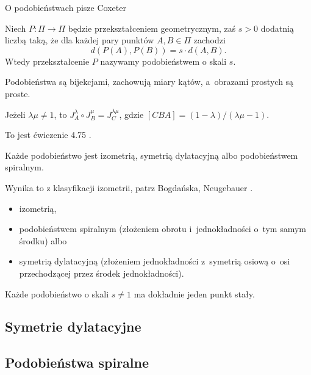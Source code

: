 
O podobieństwach pisze Coxeter \cite[s. 84]{coxeter_1967}

\begin{definition}[podobieństwo]
    Niech $P \colon \Pi \to \Pi$ będzie przekształceniem geometrycznym, zaś $s > 0$ dodatnią liczbą taką, że dla każdej pary punktów $A, B \in \Pi$ zachodzi
    \begin{equation}
        d(P(A), P(B)) = s \cdot d(A, B).
    \end{equation}
    Wtedy przekształcenie $P$ nazywamy podobieństwem o skali $s$.
\end{definition}

Podobieństwa są bijekcjami, zachowują miary kątów, a~obrazami prostych są proste.

\begin{proposition}
    Jeżeli $\lambda \mu \neq 1$, to $J_A^\lambda \circ J_B^\mu = J_C^{\lambda \mu}$, gdzie $[CBA] = (1-\lambda) / (\lambda \mu - 1)$.
\end{proposition}

To jest ćwiczenie 4.75 \cite[s. 217]{neugebauer_2018}.

\begin{proposition}
    Każde podobieństwo jest izometrią, symetrią dylatacyjną albo podobieństwem spiralnym.
\end{proposition}

Wynika to z klasyfikacji izometrii, patrz Bogdańska, Neugebauer \cite[s. 220]{neugebauer_2018}.

\begin{itemize}
        \item izometrią,
        \item podobieństwem spiralnym (złożeniem obrotu i~jednokładności o~tym samym środku) albo
        \item symetrią dylatacyjną (złożeniem jednokładności z~symetrią osiową o~osi przechodzącej przez środek jednokładności).
    \end{itemize}

\begin{proposition}
    Każde podobieństwo o skali $s \neq 1$ ma dokładnie jeden punkt stały.
\end{proposition}

\subsection{Symetrie dylatacyjne}

\subsection{Podobieństwa spiralne}
